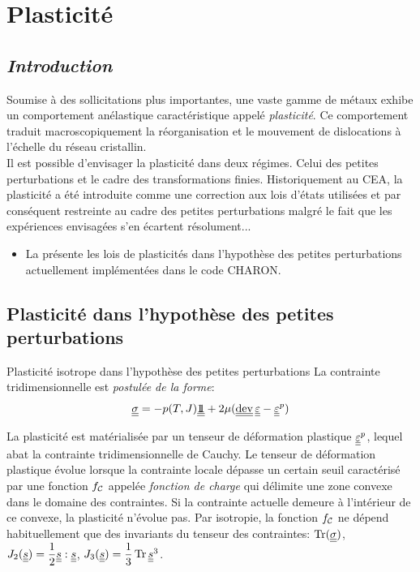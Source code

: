 \documentclass[10pt]{book}
\begin{document}
\newcommand{\DeltaDefoHPP}{\ten{\Delta}\DefoHPP}
\newcommand{\DeltaEpsP}{\DeltaDefoHPP^{p}}
\chapter{Plasticité}\label{Chapitre:Plasticité}
\section*{\emph{Introduction}}
Soumise à des sollicitations plus importantes, une vaste gamme de métaux exhibe un comportement anélastique caractéristique appelé \emph{plasticité}. Ce comportement traduit macroscopiquement la réorganisation et le mouvement de dislocations à l'échelle du réseau cristallin.\\

Il est possible d'envisager la plasticité dans deux régimes. Celui des petites perturbations et le cadre des transformations finies. Historiquement au CEA, la plasticité a été introduite comme une correction aux lois d'états utilisées et par conséquent restreinte au cadre des petites perturbations malgré le fait que les expériences envisagées s'en écartent résolument...
\begin{itemize}[label=$\star$]
\item  La  présente les lois de plasticités dans l'hypothèse des petites perturbations actuellement implémentées dans le code CHARON.
\end{itemize}
\section{Plasticité dans l'hypothèse des petites perturbations}\label{Section:Introduction de la plasticité HPP}
\begin{Postulat}{Plasticité isotrope dans l'hypothèse des petites perturbations} La contrainte tridimensionnelle est \emph{postulée de la forme}:
$$\SC=-p(T,\J)\TenUnit+2\mu(\dev\Eps-\EpsP)$$
\end{Postulat}
La plasticité est matérialisée par un tenseur de déformation plastique $\underline{\underline{\varepsilon}}^p$, lequel abat la contrainte tridimensionnelle de Cauchy. Le tenseur de déformation plastique évolue lorsque la contrainte locale dépasse un certain seuil caractérisé par une fonction $f_{\mathcal{C}}$ appelée \emph{fonction de charge} qui délimite une zone convexe dans le domaine des contraintes. Si la contrainte actuelle demeure à l'intérieur de ce convexe, la plasticité n'évolue pas. Par isotropie, la fonction $f_{\mathcal{C}}$ ne dépend habituellement que des invariants du tenseur des contraintes: $\tr(\SC)$, $J_{2}(\underline{\underline{s}}) = \dfrac{1}{2}\underline{\underline{s}}:\underline{\underline{s}}$, $J_{3}(\devia) = \dfrac{1}{3}\tr\devia^{3}$.
\end{document}
